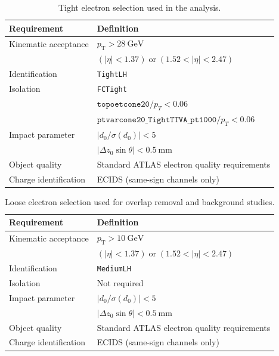\begin{table}[ht]
  \caption{Tight electron selection used in the analysis.}
  \label{tab:object:electron}
  \centering
  \begin{tabular}{ll}
    \toprule
    Requirement & Definition \\
    \midrule
    Kinematic acceptance &
    $p_{\mathrm{T}} > 28~\mathrm{GeV}$ \\
    &
    $(|\eta| < 1.37)\; \text{or}\; (1.52 < |\eta| < 2.47)$ \\
    \midrule
    Identification & \texttt{TightLH} \\
    \midrule
    Isolation &
    \texttt{FCTight} \\
    &
    $\texttt{topoetcone20}/p_T < 0.06$ \\
    &
    $\texttt{ptvarcone20\_TightTTVA\_pt1000}/p_T < 0.06$ \\
    \midrule
    Impact parameter &
    $|d_0/\sigma(d_0)| < 5$ \\
    &
    $|\Delta z_0 \sin\theta| < 0.5~\mathrm{mm}$ \\
    \midrule
    Object quality &
    Standard ATLAS electron quality requirements \\
    \midrule
    Charge identification &
    ECIDS (same-sign channels only) \\
    \bottomrule
  \end{tabular}
\end{table}

\begin{table}[ht]
  \caption{Loose electron selection used for overlap removal and background studies.}
  \label{tab:object:loose_electron}
  \centering
  \begin{tabular}{ll}
    \toprule
    Requirement & Definition \\
    \midrule
    Kinematic acceptance &
    $p_{\mathrm{T}} > 10~\mathrm{GeV}$ \\
    &
    $(|\eta| < 1.37)\; \text{or}\; (1.52 < |\eta| < 2.47)$ \\
    \midrule
    Identification & \texttt{MediumLH} \\
    \midrule
    Isolation & Not required \\
    \midrule
    Impact parameter &
    $|d_0/\sigma(d_0)| < 5$ \\
    &
    $|\Delta z_0 \sin\theta| < 0.5~\mathrm{mm}$ \\
    \midrule
    Object quality &
    Standard ATLAS electron quality requirements \\
    \midrule
    Charge identification &
    ECIDS (same-sign channels only) \\
    \bottomrule
  \end{tabular}
\end{table}

